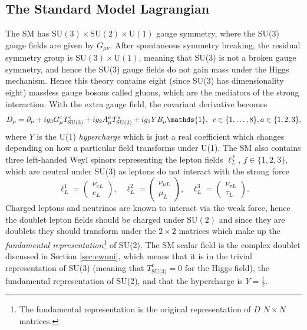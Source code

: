 \subsection{The Standard Model Lagrangian}%
The SM has $\text{SU}(3)\times\text{SU}(2)\times\text{U}(1)$ gauge symmetry, where the SU(3) gauge fields are given by $G_{\mu\nu}$. After spontaneous symmetry breaking, the residual symmetry group is $\text{SU}(3)\times\text{U}(1)$, meaning that SU(3) is not a broken gauge symmetry, and hence the SU(3) gauge fields do not gain mass under the Higgs mechanism. Hence this theory contains eight (since SU(3) has dimensionality eight) massless gauge bosons called gluons, which are the mediators of the strong interaction. With the extra gauge field, the covariant derivative becomes
\begin{equation}
   D_\mu=\dmu+ig_3G_\mu^cT^c_{\text{SU}(3)}+ig_2\amu^aT^a_{\text{SU}(2)}+ig_1YB_\mu\mathds{1},\hspace{5pt}c\in\{1,\dots,8\}, a\in\{1,2,3\}, 
\end{equation}
where $Y$ is the U(1) \textit{hypercharge} which is just a real coefficient which changes depending on how a particular field transforms under U(1). The SM also contains three left-handed Weyl spinors representing the lepton fields $\ell^f_L$, $f\in\{1,2,3\}$, which are neutral under SU(3) as leptons do not interact with the strong force 
\begin{equation}
    \ell^{1}_L=
    \begin{pmatrix}
        \nu_{eL}\\
        e_L
    \end{pmatrix}
    ,\hspace{10pt}
    \ell^{2}_L=
    \begin{pmatrix}
        \nu_{\mu L}\\
        \mu_L
    \end{pmatrix}
    ,\hspace{10pt}
    \ell^{3}_L=
    \begin{pmatrix}
        \nu_{\tau L}\\
        \tau_L
    \end{pmatrix}
    .
\end{equation}
Charged leptons and neutrinos are known to interact via the weak force, hence the doublet lepton fields should be charged under $\text{SU}(2)$ and since they are doublets they should transform under the $2\times2$ matrices which make up the \textit{fundamental representation}\footnote{The fundamental representation is the original representation of $D$ $N\times N$ matrices.} of SU(2). The SM scalar field is the complex doublet discussed in Section \ref{sec:ewuni}, which means that it is in the trivial representation of SU(3) (meaning that $T^c_{\text{SU(3)}}=0$ for the Higgs field), the fundamental representation of SU(2), and that the hypercharge is $Y=\frac{1}{2}$.
